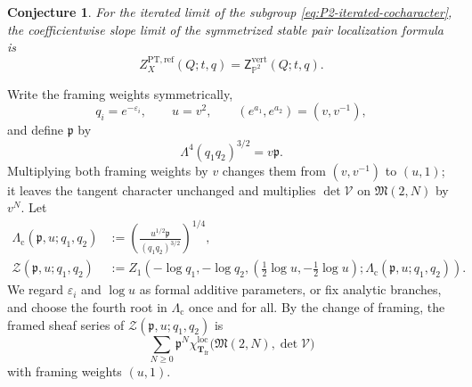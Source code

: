 \documentclass[10pt,a4paper]{amsart}
\newtheorem{conjecture}{Conjecture}
\newcommand{\M}{\mathfrak M}
\newcommand{\cV}{\mathcal V}
\newcommand{\eps}{\varepsilon}
\begin{document}
\begin{conjecture}
\label{conj:P2-vertex-comparison}
For the iterated limit of the subgroup \eqref{eq:P2-iterated-cocharacter}, the coefficientwise slope limit of the symmetrized stable pair localization formula is
\begin{equation}
 Z_{X}^{\mathrm{PT},\mathrm{ref}}(Q;t,q)
 =\mathsf Z_{\mathbb P^2}^{\mathrm{vert}}(Q;t,q).
\label{eq:P2-PT-equals-IK-vertex}
\end{equation}
\end{conjecture}

Write the framing weights symmetrically,
\[
 q_i=e^{-\eps_i},\qquad u=v^2,\qquad
 (e^{a_1},e^{a_2})=(v,v^{-1}),
\]
and define \(\mathfrak p\) by
\begin{equation}
 \Lambda^4(q_1q_2)^{3/2}=v\mathfrak p.
\label{eq:NY-p-variable}
\end{equation}
Multiplying both framing weights by \(v\) changes them from \((v,v^{-1})\) to \((u,1)\); it leaves the tangent character unchanged and multiplies \(\det\cV\) on \(\M(2,N)\) by \(v^N\).  Let
\begin{equation}
\begin{aligned}
 \Lambda_{\mathrm c}(\mathfrak p,u;q_1,q_2)
 &:={}
 \left(\frac{u^{1/2}\mathfrak p}{(q_1q_2)^{3/2}}\right)^{1/4},\\
 \mathscr Z(\mathfrak p,u;q_1,q_2)
 &:={}
 Z_1\left(
 -\log q_1,-\log q_2,
 \left(\tfrac12\log u,-\tfrac12\log u\right);
 \Lambda_{\mathrm c}(\mathfrak p,u;q_1,q_2)
 \right).
\end{aligned}
\label{eq:NY-mathscrZ-definition}
\end{equation}
We regard \(\eps_i\) and \(\log u\) as formal additive parameters, or fix analytic branches, and choose the fourth root in \(\Lambda_{\mathrm c}\) once and for all.  By the change of framing, the framed sheaf series of \(\mathscr Z(\mathfrak p,u;q_1,q_2)\) is
\begin{equation}
 \sum_{N\geq0}\mathfrak p^N
 \chi_{\mathbf T_{\mathrm{fr}}}^{\mathrm{loc}}\bigl(\M(2,N),\det\cV\bigr)
\label{eq:NY-centered-ADHM}
\end{equation}
with framing weights \((u,1)\).
\end{document}
